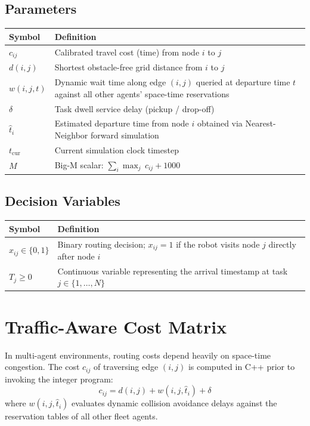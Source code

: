\documentclass[10pt, twocolumn]{article}
\begin{document}
\subsection*{Parameters}
\begin{tabularx}{\columnwidth}{lX}
\toprule
Symbol & Definition \\
\midrule
$c_{ij}$ & Calibrated travel cost (time) from node $i$ to $j$ \\
$d(i,j)$ & Shortest obstacle-free grid distance from $i$ to $j$ \\
$w(i,j,t)$ & Dynamic wait time along edge $(i,j)$ queried at departure time $t$ against all other agents' space-time reservations \\
$\delta$ & Task dwell service delay (pickup / drop-off) \\
$\hat{t}_i$ & Estimated departure time from node $i$ obtained via Nearest-Neighbor forward simulation \\
$t_{\mathrm{cur}}$ & Current simulation clock timestep \\
$M$ & Big-M scalar: $\sum_{i}\max_{j}\, c_{ij} + 1000$ \\
\bottomrule
\end{tabularx}

\subsection*{Decision Variables}
\begin{tabularx}{\columnwidth}{lX}
\toprule
Symbol & Definition \\
\midrule
$x_{ij} \in \{0,1\}$ & Binary routing decision; $x_{ij} = 1$ if the robot visits node $j$ directly after node $i$ \\
$T_j \geq 0$ & Continuous variable representing the arrival timestamp at task $j \in \{1,\ldots,N\}$ \\
\bottomrule
\end{tabularx}

\section{Traffic-Aware Cost Matrix}

In multi-agent environments, routing costs depend heavily on space-time congestion. The cost $c_{ij}$ of traversing edge $(i, j)$ is computed in C++ prior to invoking the integer program:
\begin{equation}
  c_{ij} = d(i,j) + w(i,j,\hat{t}_i) + \delta
  \label{eq:cost}
\end{equation}
where $w(i,j,\hat{t}_i)$ evaluates dynamic collision avoidance delays against the reservation tables of all other fleet agents.
\end{document}
